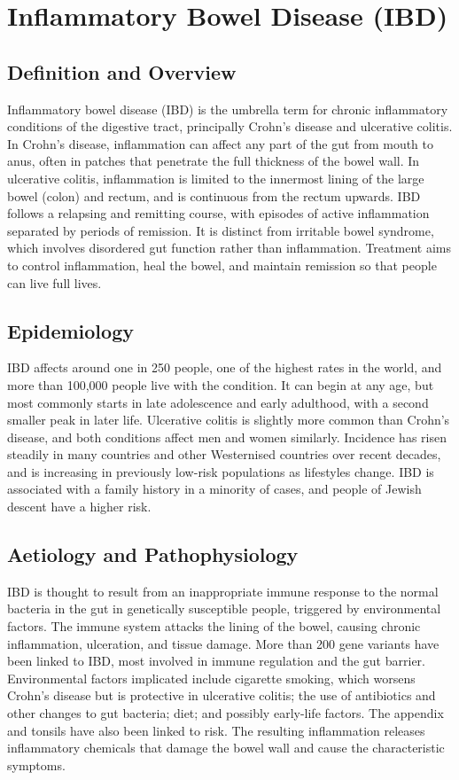 \chapter{Inflammatory Bowel Disease (IBD)}

\section*{Definition and Overview}
Inflammatory bowel disease (IBD) is the umbrella term for chronic inflammatory conditions of the digestive tract, principally Crohn's disease and ulcerative colitis. In Crohn's disease, inflammation can affect any part of the gut from mouth to anus, often in patches that penetrate the full thickness of the bowel wall. In ulcerative colitis, inflammation is limited to the innermost lining of the large bowel (colon) and rectum, and is continuous from the rectum upwards. IBD follows a relapsing and remitting course, with episodes of active inflammation separated by periods of remission. It is distinct from irritable bowel syndrome, which involves disordered gut function rather than inflammation. Treatment aims to control inflammation, heal the bowel, and maintain remission so that people can live full lives.

\section*{Epidemiology}
IBD affects around one in 250 people, one of the highest rates in the world, and more than 100,000 people live with the condition. It can begin at any age, but most commonly starts in late adolescence and early adulthood, with a second smaller peak in later life. Ulcerative colitis is slightly more common than Crohn's disease, and both conditions affect men and women similarly. Incidence has risen steadily in many countries and other Westernised countries over recent decades, and is increasing in previously low-risk populations as lifestyles change. IBD is associated with a family history in a minority of cases, and people of Jewish descent have a higher risk.

\section*{Aetiology and Pathophysiology}
IBD is thought to result from an inappropriate immune response to the normal bacteria in the gut in genetically susceptible people, triggered by environmental factors. The immune system attacks the lining of the bowel, causing chronic inflammation, ulceration, and tissue damage. More than 200 gene variants have been linked to IBD, most involved in immune regulation and the gut barrier. Environmental factors implicated include cigarette smoking, which worsens Crohn's disease but is protective in ulcerative colitis; the use of antibiotics and other changes to gut bacteria; diet; and possibly early-life factors. The appendix and tonsils have also been linked to risk. The resulting inflammation releases inflammatory chemicals that damage the bowel wall and cause the characteristic symptoms.

